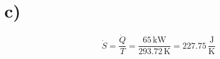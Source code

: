 

\section*{c)}

\[
\dot{S} = \frac{\dot{Q}}{T} = \frac{65 \, \text{kW}}{293.72 \, \text{K}} = 227.75 \, \frac{\text{J}}{\text{K}}
\]
